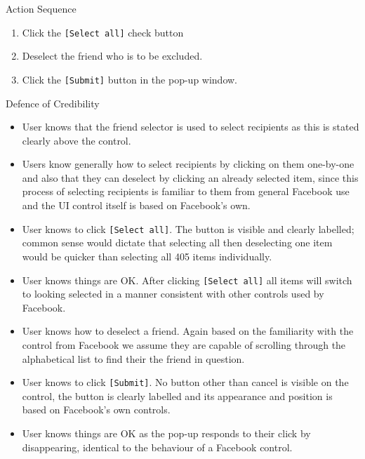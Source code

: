 \begin{desc}

    \item[Action Sequence] \hfill
    \begin{enumerate}
        \item Click the {\tt [Select all]} check button
        \item Deselect the friend who is to be excluded.
        \item Click the {\tt [Submit]} button in the pop-up window.
    \end{enumerate}
    
    \item[Defence of Credibility] \hfill
        \begin{itemize}
            
            \item User knows that the friend selector is used to select recipients as this is stated clearly above the control.
            
            \item Users know generally how to select recipients by clicking on them one-by-one and also that they can deselect by clicking an already selected item, since this process of selecting recipients is familiar to them from general Facebook use and the UI control itself is based on Facebook's own. 
            
            \item User knows to click {\tt [Select all]}. The button is visible and clearly labelled; common sense would dictate that selecting all then deselecting one item would be quicker than selecting all 405 items individually.
            
            \item User knows things are OK. After clicking {\tt [Select all]} all items will switch to looking selected in a manner consistent with other controls used by Facebook.
            
            \item User knows how to deselect a friend. Again based on the familiarity with the control from Facebook we assume they are capable of scrolling through the alphabetical list to find their the friend in question.
            
            \item User knows to click {\tt [Submit]}. No button other than cancel is visible on the control, the button is clearly labelled and its appearance and position is based on Facebook's own controls.
            
            \item User knows things are OK as the pop-up responds to their click by disappearing, identical to the behaviour of a Facebook control.
        
        \end{itemize}
    
\end{desc}